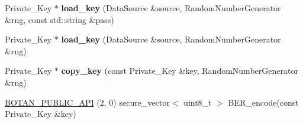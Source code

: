 \begin{DoxyCompactItemize}
\item 
\mbox{\label{namespace_botan_1_1_p_k_c_s8_acd7a153bfd812efe5dde18befbb5c6f5}} 
Private\+\_\+\+Key $\ast$ {\bfseries load\+\_\+key} (Data\+Source \&source, Random\+Number\+Generator \&rng, const std\+::string \&pass)
\item 
\mbox{\label{namespace_botan_1_1_p_k_c_s8_ac54f29979d71f9e890251074e49323c0}} 
Private\+\_\+\+Key $\ast$ {\bfseries load\+\_\+key} (Data\+Source \&source, Random\+Number\+Generator \&rng)
\item 
\mbox{\label{namespace_botan_1_1_p_k_c_s8_a0c780e2eb58d9b19eb78b7e05cdd61a7}} 
Private\+\_\+\+Key $\ast$ {\bfseries copy\+\_\+key} (const Private\+\_\+\+Key \&key, Random\+Number\+Generator \&rng)
\item 
\mbox{\hyperlink{namespace_botan_1_1_p_k_c_s8_a1a8abd3b8ed274b93110ebebefcb0eb6}{B\+O\+T\+A\+N\+\_\+\+P\+U\+B\+L\+I\+C\+\_\+\+A\+PI}} (2, 0) secure\+\_\+vector$<$ uint8\+\_\+t $>$ B\+E\+R\+\_\+encode(const Private\+\_\+\+Key \&key)
\end{DoxyCompactItemize}

